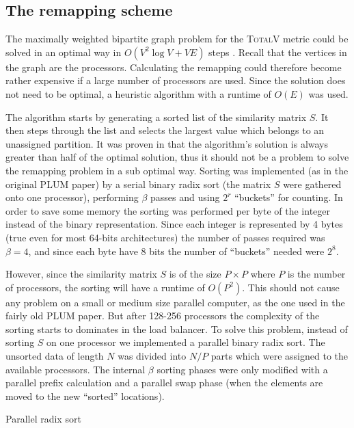 
\subsection{The remapping scheme}

The maximally weighted bipartite graph problem for the \textsc{TotalV}
metric could be solved in an optimal way in $O(V^2 \log V + V E)$
steps \cite{Oli1998a}. Recall that the vertices in the graph are the
processors. Calculating the remapping could therefore become rather
expensive if a large number of processors are used. Since the solution
does not need to be optimal, a heuristic algorithm with a runtime of
$O(E)$ was used.

The algorithm starts by generating a sorted list of the similarity
matrix $S$. It then steps through the list and selects the largest
value which belongs to an unassigned partition. It was proven in
\cite{Oli1998a} that the algorithm's solution is always greater than
half of the optimal solution, thus it should not be a problem to solve
the remapping problem in a sub optimal way. Sorting was implemented
(as in the original PLUM paper) by a serial binary radix sort (the
matrix $S$ were gathered onto one processor), performing $\beta$
passes and using $2^r$ ``buckets'' for counting. In order to save some
memory the sorting was performed per byte of the integer instead of
the binary representation. Since each integer is represented by 4
bytes (true even for most 64-bits architectures) the number of passes
required was $\beta = 4$, and since each byte have 8 bits the number
of ``buckets'' needed were $2^8$.

However, since the similarity matrix $S$ is of the size $P \times P$
where $P$ is the number of processors, the sorting will have a runtime
of $O(P^2)$. This should not cause any problem on a small or medium
size parallel computer, as the one used in the fairly old PLUM
paper. But after 128-256 processors the complexity of the sorting
starts to dominates in the load balancer. To solve this problem,
instead of sorting $S$ on one processor we implemented a parallel
binary radix sort. The unsorted data of length $N$ was divided into
$N/P$ parts which were assigned to the available processors. The
internal $\beta$ sorting phases were only modified with a parallel
prefix calculation and a parallel swap phase (when the elements are
moved to the new ``sorted'' locations).
\begin{algorithm}
  \caption{Parallel radix sort}
  \label{alg:pradix}
\end{algorithm}


